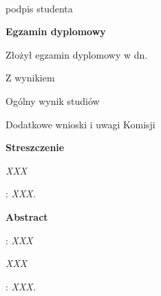 \begin{titlepage}
    \par
    \vspace{2\baselineskip}
    \hfill\parbox{15em}{{\small\dotfill}\\[-.3ex]
    \centerline{\footnotesize podpis studenta}}\par
    \vspace{1\baselineskip}
    \begin{center}
 	{\large\bfseries Egzamin dyplomowy} \par\bigskip\bigskip
    \end{center}
    \par\noindent\vspace{1.0\baselineskip}
    Złożył egzamin dyplomowy w dn. \dotfill
    \par\noindent\vspace{1.0\baselineskip}
    Z wynikiem \dotfill
    \par\noindent\vspace{1.0\baselineskip}
    Ogólny wynik studiów \dotfill
    \par\noindent\vspace{1.0\baselineskip}
    Dodatkowe wnioski i uwagi Komisji \dotfill
    \par\noindent\vspace{1.0\baselineskip}
    \dotfill

    \newpage\thispagestyle{empty}
    \vspace*{2\baselineskip}
    \begin{center}
	{\large\bfseries Streszczenie}\par\bigskip
	\vspace*{2\baselineskip}
    \end{center}

    \itshape
    XXX
    \vspace*{3\baselineskip}

    : {\itshape XXX.}
    
    \newpage\thispagestyle{empty}
    \vspace*{2\baselineskip}
    \begin{center}
	{\large\bfseries Abstract}\par\bigskip
	\vspace*{2\baselineskip}
    \end{center}
    : {\itshape XXX}\par
    \vspace*{1\baselineskip}
    \itshape
    XXX
    \vspace*{3\baselineskip}

    : {\itshape XXX.}

\end{titlepage}

